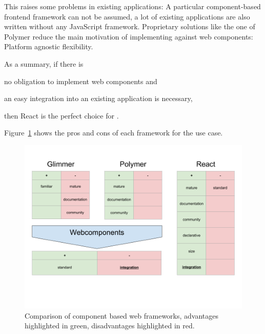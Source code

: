 This raises some problems in existing applications:
A particular component-based frontend framework can not be assumed, a lot of existing applications are also written without any JavaScript framework.
Proprietary solutions like the one of Polymer reduce the main motivation of implementing against web components:
Platform agnostic flexibility.

As a summary, if there is
\begin{enumerate*}[label=(\arabic*)]
  \item no obligation to implement web components and
  \item an easy integration into an existing application is necessary,
\end{enumerate*}
then React is the perfect choice for \cmvs{}.

Figure~\ref{fig:implementation:frontend-frameworks} shows the pros and cons of each framework for the use case.

\begin{figure}[h]
  \centering
  \caption{Comparison of component based web frameworks, advantages highlighted in green, disadvantages highlighted in red.}\label{fig:implementation:frontend-frameworks}
  \includegraphics[width=\textwidth]{images/frontend-frameworks.png}
\end{figure}

